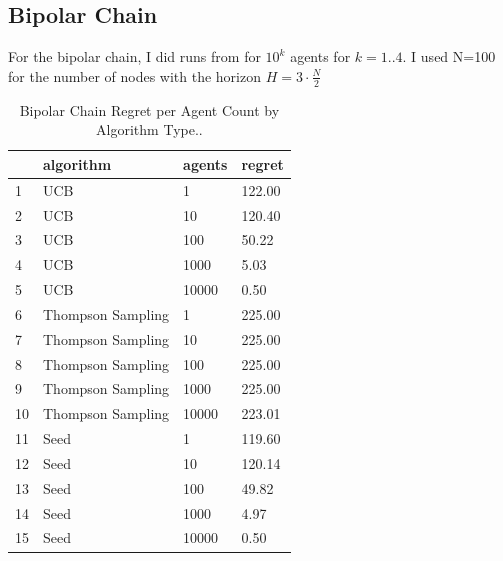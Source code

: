 \documentclass{article}
\begin{document}
\subsection{Bipolar Chain}
For the bipolar chain, I did runs from for $10^k$ agents for $k=1..4$. I used N=100 for the number of nodes with the horizon $H=3 \cdot \frac{N}{2}$
\begin{table}[ht]
\caption{Bipolar Chain Regret per Agent Count by Algorithm Type..}
\label{bipolarregretperagentbyalgo-table}
\vskip 0.15in
\centering
\begin{tabular}{llll}
  \toprule
 & algorithm & agents & regret \\ 
  \midrule
1 & UCB &   1 & 122.00 \\ 
  2 & UCB &  10 & 120.40 \\ 
  3 & UCB & 100 & 50.22 \\ 
  4 & UCB & 1000 & 5.03 \\ 
  5 & UCB & 10000 & 0.50 \\ 
  6 & Thompson Sampling &   1 & 225.00 \\ 
  7 & Thompson Sampling &  10 & 225.00 \\ 
  8 & Thompson Sampling & 100 & 225.00 \\ 
  9 & Thompson Sampling & 1000 & 225.00 \\ 
  10 & Thompson Sampling & 10000 & 223.01 \\ 
  11 & Seed &   1 & 119.60 \\ 
  12 & Seed &  10 & 120.14 \\ 
  13 & Seed & 100 & 49.82 \\ 
  14 & Seed & 1000 & 4.97 \\ 
  15 & Seed & 10000 & 0.50 \\ 
   \bottomrule
\end{tabular}
\end{table}
\end{document}
